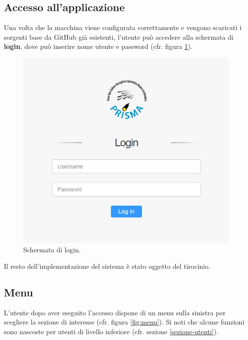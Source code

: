 \subsection{Accesso all'applicazione} \label{accesso-app}

Una volta che la macchina viene configurata correttamente e vengono scaricati i sorgenti base da GitHub già esistenti, l'utente può accedere alla schermata di \textbf{login}, dove può inserire nome utente e password (cfr. figura \ref{fig:login}).

\begin{figure}
    \begin{center}
    \includegraphics[scale=0.7]{images/login.jpg}
    \caption{Schermata di login.}
    \label{fig:login}
    \end{center}
\end{figure}

Il resto dell'implementazione del sistema è stato oggetto del tirocinio.

\subsection{Menu}

L'utente dopo aver eseguito l'accesso dispone di un menu sulla sinistra per scegliere la sezione di interesse (cfr. figura \ref{fig:menu}). Si noti che alcune funzioni sono nascoste per utenti di livello inferiore (cfr. sezione \ref{sezione-utenti}).

